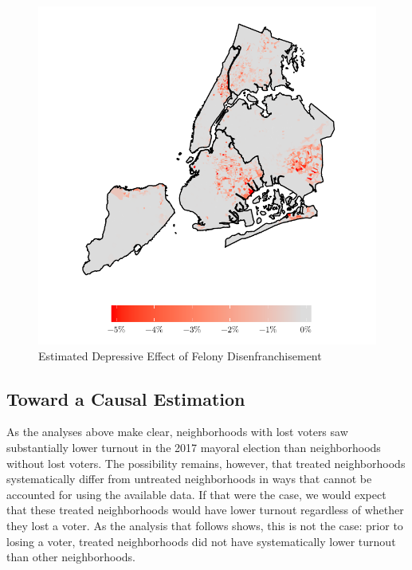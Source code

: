 \documentclass[12pt,]{article}
\begin{document}
\begin{figure}[H]

{\centering \includegraphics{p1_files/figure-latex/postest-map-1} 

}

\caption{\label{fig:postest}Estimated Depressive Effect of Felony Disenfranchisement}\label{fig:postest-map}
\end{figure}

\hypertarget{toward-a-causal-estimation}{%
\subsection*{Toward a Causal Estimation}\label{toward-a-causal-estimation}}

As the analyses above make clear, neighborhoods with lost voters saw substantially lower turnout in the 2017 mayoral election than neighborhoods without lost voters. The possibility remains, however, that treated neighborhoods systematically differ from untreated neighborhoods in ways that cannot be accounted for using the available data. If that were the case, we would expect that these treated neighborhoods would have lower turnout regardless of whether they lost a voter. As the analysis that follows shows, this is not the case: prior to losing a voter, treated neighborhoods did not have systematically lower turnout than other neighborhoods.
\end{document}
